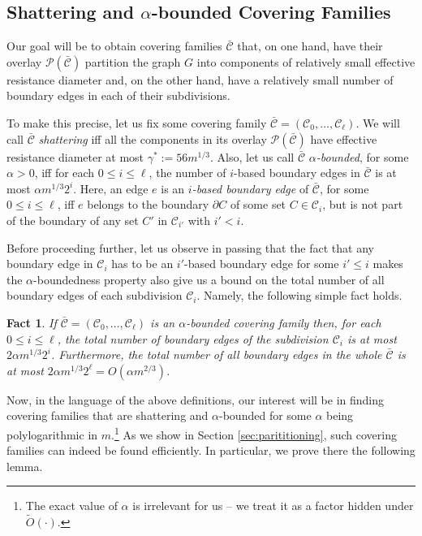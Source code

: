 \documentclass[11pt, letterpaper]{article}
\newtheorem{fact}[theorem]{Fact}
\newcommand{\cC}{\mathcal{C}}
\newcommand{\ocC}{\bar{\mathcal{C}}}
\newcommand{\cP}{\mathcal{P}}
\newcommand{\tO}{\widetilde{O}}
\newcommand{\Dstar}{\gamma^*}
\begin{document}
\subsection{Shattering and $\alpha$-bounded Covering Families}\label{sec:shattering_alpha_bounded_families}

Our goal will be to obtain covering families $\ocC$ that, on one hand, have their overlay $\cP(\ocC)$ partition the graph $G$ into components of relatively small effective resistance diameter and, on the other hand, have a relatively small number of boundary edges in each of their subdivisions.

To make this precise, let us fix some covering family $\ocC=(\cC_0,\ldots, \cC_{\ell})$. We will call $\ocC$ {\em shattering} iff all the components in its overlay $\cP(\ocC)$ have effective resistance diameter at most $\Dstar:=56 m^{1/3}$. Also, let us call $\ocC$ {\em $\alpha$-bounded}, for some $\alpha>0$, iff for each $0\leq i\leq \ell$, the number of $i$-based boundary edges in $\ocC$ is at most $\alpha m^{1/3} 2^i$. Here, an edge $e$ is an {\em $i$-based boundary edge} of $\ocC$, for some $0\leq i\leq \ell$, iff $e$ belongs to the boundary $\partial C$ of some set $C\in \cC_i$, but is not part of the boundary of any set $C'$ in $\cC_{i'}$ with $i'<i$.

Before proceeding further, let us observe in passing that the fact that any boundary edge in $\cC_i$ has to be an $i'$-based boundary edge for some $i'\leq i$ makes the $\alpha$-boundedness property also give us a bound on the total number of all boundary edges of each subdivision $\cC_i$. Namely, the following simple fact holds.

\begin{fact}
\label{fa:alpha_boundness_and_boundary_edges}
If $\ocC=(\cC_0,\ldots, \cC_{\ell})$ is an $\alpha$-bounded covering family then, for each $0\leq i\leq \ell$, the total number of boundary edges of the subdivision $\cC_i$ is at most $2\alpha m^{1/3}2^{i}$. Furthermore, the total number of all boundary edges in the whole $\ocC$ is at most $2\alpha m^{1/3}2^{\ell}=O(\alpha m^{2/3})$.
\end{fact}

Now, in the language of the above definitions, our interest will be in finding covering families that are shattering and $\alpha$-bounded for some $\alpha$ being polylogarithmic in $m$.\footnote{The exact value of $\alpha$ is irrelevant for us -- we treat it as a factor hidden under $\tO(\cdot)$.} As we show in Section \ref{sec:parititioning}, such covering families can indeed be found efficiently. In particular, we prove there the following lemma.
\end{document}
